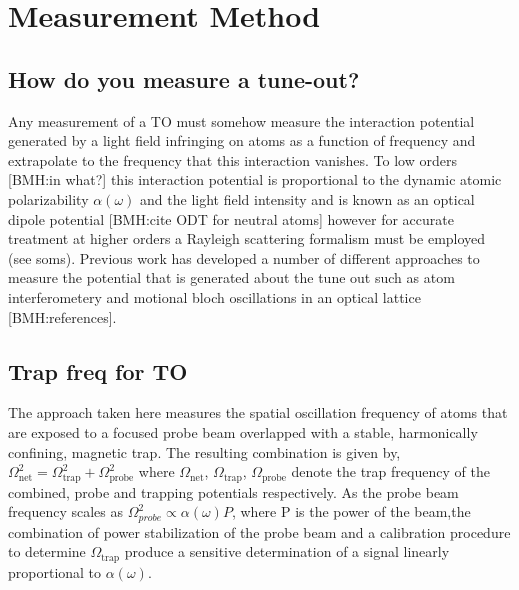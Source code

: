 \documentclass[aps,prl,
,reprint,
superscriptaddress,
onecolumn,
showpacs,preprintnumbers,
 amsmath,amssymb,
]{revtex4-1}
\newcommand{\brycecom}[1]{{\color{ProcessBlue}[BMH:{#1}]\normalcolor}} %
\begin{document}
\section{Measurement Method}

\subsection{How do you measure a tune-out?}
Any measurement of a TO must somehow measure the interaction potential generated by a light field infringing on atoms as a function of frequency and extrapolate to the frequency that this interaction vanishes. To low orders \brycecom{in what?} this interaction potential is proportional to the dynamic atomic polarizability \(\alpha(\omega)\) and the light field intensity and is known as an optical dipole potential \brycecom{cite ODT for neutral atoms} however for accurate treatment at higher orders a Rayleigh scattering formalism must be employed (see soms)\cite{Drake2019}.
Previous work has developed a number of different approaches to measure the potential that is generated about the tune out such as atom interferometery and motional bloch oscillations in an optical lattice \brycecom{references}. 

\subsection{Trap freq for TO}
The approach taken here measures the spatial oscillation frequency of atoms that are exposed to a focused probe beam overlapped with a stable, harmonically confining, magnetic trap. The resulting combination is given by,  \(\Omega_{\text{net}}^2=\Omega_{\text{trap}}^2+\Omega_{\text{probe}}^2\) where \(\Omega_{\text{net}}\), \(\Omega_{\text{trap}}\), \(\Omega_{\text{probe}}\) denote the trap frequency of the combined, probe and trapping potentials respectively. As the probe beam frequency scales as \(\Omega_{probe}^2\propto \alpha(\omega) P\), where P is the power of the beam,the combination of power stabilization of the probe beam and a calibration procedure to determine \(\Omega_{\text{trap}}\) produce a sensitive determination of a signal linearly proportional to \(\alpha(\omega)\).

\end{document}
